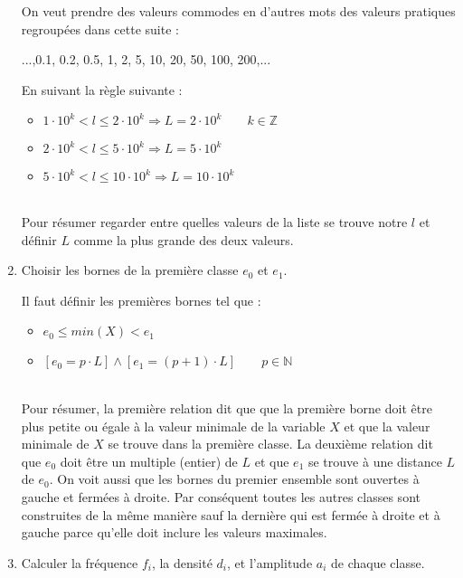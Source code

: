 \documentclass{report}
\begin{document}
\begin{enumerate}
  On veut prendre des valeurs commodes en d'autres mots des valeurs pratiques regroupées dans cette suite :

  \begin{center}
        ...,0.1, 0.2, 0.5, 1, 2, 5, 10, 20, 50, 100, 200,...
  \end{center}
  \quad

  En suivant la règle suivante : \\
  
  \begin{itemize}
  \item $1\cdot10^k<l\leq2\cdot10^k\Rightarrow L = 2\cdot10^k \qquad k\in\mathbb{Z} $
  \item $2\cdot10^k<l\leq5\cdot10^k\Rightarrow L = 5\cdot10^k$
  \item $5\cdot10^k<l\leq10\cdot10^k\Rightarrow L = 10\cdot10^k$
\end{itemize}
\quad\\
Pour résumer regarder entre quelles valeurs de la liste se trouve notre $l$ et définir $L$ comme la plus grande des deux valeurs.

  \item Choisir les bornes de la première classe $e_0$ et $e_1$.
  
  Il faut définir les premières bornes tel que : \\
  
  \begin{itemize}
  \item $e_0\leq min(X) < e_1$ 
  \item $[e_0 = p \cdot L]\wedge[e_1 = (p+1)\cdot L] \qquad p\in\mathbb{N}$
\end{itemize}
\quad\\
Pour résumer, la première relation dit que que la première borne doit être plus petite ou égale à la valeur minimale de la variable $X$ et que la valeur minimale de $X$ se trouve dans la première classe. La deuxième relation dit que $e_0$ doit être un multiple (entier) de $L$ et que $e_1$ se trouve à une distance $L$ de $e_0$. On voit aussi que les bornes du premier ensemble sont ouvertes à gauche et fermées à droite. Par conséquent toutes les autres classes sont construites de la même manière sauf la dernière qui est fermée à droite et à gauche parce qu'elle doit inclure les valeurs maximales.
  
  \item Calculer la fréquence $f_i$, la densité $d_i$, et l'amplitude $a_i$ de chaque classe. 
  

\end{enumerate}
\end{document}
